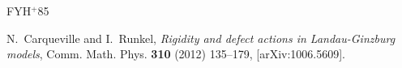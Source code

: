 \documentclass{compositio}
\theoremstyle{definition}
\numberwithin{equation}{section}
\begin{document}
\newcommand{\etalchar}[1]{$^{#1}$}
\providecommand{\href}[2]{#2}
\begin{thebibliography}{FYH{\etalchar{+}}85}

%
%
%
%
%
%
%

N.~Carqueville and I.~Runkel, \emph{Rigidity and defect actions in
  Landau-Ginzburg models}, Comm. Math. Phys. \textbf{310} (2012) 135--179, 
  \href{http://arxiv.org/abs/1006.5609}{[arXiv:1006.5609]}.


\end{thebibliography}
\end{document}

